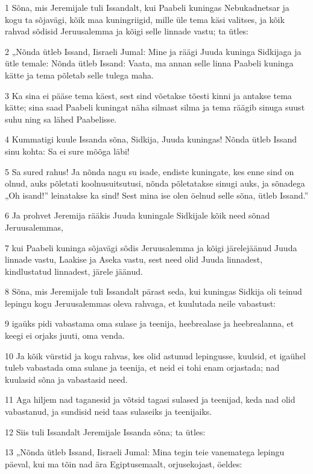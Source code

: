 \par 1 Sõna, mis Jeremijale tuli Issandalt, kui Paabeli kuningas Nebukadnetsar ja kogu ta sõjavägi, kõik maa kuningriigid, mille üle tema käsi valitses, ja kõik rahvad sõdisid Jeruusalemma ja kõigi selle linnade vastu; ta ütles:
\par 2 „Nõnda ütleb Issand, Iisraeli Jumal: Mine ja räägi Juuda kuninga Sidkijaga ja ütle temale: Nõnda ütleb Issand: Vaata, ma annan selle linna Paabeli kuninga kätte ja tema põletab selle tulega maha.
\par 3 Ka sina ei pääse tema käest, sest sind võetakse tõesti kinni ja antakse tema kätte; sina saad Paabeli kuningat näha silmast silma ja tema räägib sinuga suust suhu ning sa lähed Paabelisse.
\par 4 Kummatigi kuule Issanda sõna, Sidkija, Juuda kuningas! Nõnda ütleb Issand sinu kohta: Sa ei sure mõõga läbi!
\par 5 Sa sured rahus! Ja nõnda nagu su isade, endiste kuningate, kes enne sind on olnud, auks põletati koolnusuitsutusi, nõnda põletatakse sinugi auks, ja sõnadega „Oh isand!” leinatakse ka sind! Sest mina ise olen öelnud selle sõna, ütleb Issand.”
\par 6 Ja prohvet Jeremija rääkis Juuda kuningale Sidkijale kõik need sõnad Jeruusalemmas,
\par 7 kui Paabeli kuninga sõjavägi sõdis Jeruusalemma ja kõigi järelejäänud Juuda linnade vastu, Laakise ja Aseka vastu, sest need olid Juuda linnadest, kindlustatud linnadest, järele jäänud.
\par 8 Sõna, mis Jeremijale tuli Issandalt pärast seda, kui kuningas Sidkija oli teinud lepingu kogu Jeruusalemmas oleva rahvaga, et kuulutada neile vabastust:
\par 9 igaüks pidi vabastama oma sulase ja teenija, heebrealase ja heebrealanna, et keegi ei orjaks juuti, oma venda.
\par 10 Ja kõik vürstid ja kogu rahvas, kes olid astunud lepingusse, kuulsid, et igaühel tuleb vabastada oma sulane ja teenija, et neid ei tohi enam orjastada; nad kuulasid sõna ja vabastasid need.
\par 11 Aga hiljem nad taganesid ja võtsid tagasi sulased ja teenijad, keda nad olid vabastanud, ja sundisid neid taas sulaseiks ja teenijaiks.
\par 12 Siis tuli Issandalt Jeremijale Issanda sõna; ta ütles:
\par 13 „Nõnda ütleb Issand, Iisraeli Jumal: Mina tegin teie vanematega lepingu päeval, kui ma tõin nad ära Egiptusemaalt, orjusekojast, öeldes:
